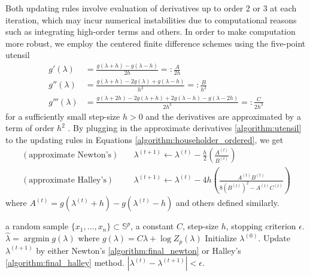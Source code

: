 \documentclass[11pt]{article}
\DeclareMathOperator*{\argmin}{argmin}
\newcommand{\bbS}{\mathbb{S}}
\begin{document}
Both updating rules involve evaluation of derivatives up to order 2 or 3 at each iteration, which may incur numerical instabilities due to computational reasons such as integrating high-order terms and others. %
In order to make computation more robust, we  employ the centered finite difference schemes using the five-point utensil 
\begin{subequations}\label{algorithm:utensil}
	\begin{align}
	g'(\lambda) &= \frac{g(\lambda+h) - g(\lambda-h)}{2h} =: \frac{A}{2h} \\
	g''(\lambda) &= \frac{g(\lambda+h)-2g(\lambda)+g(\lambda-h)}{h^2} =: \frac{B}{h^2} \\
	g'''(\lambda) &= \frac{g(\lambda+2h)-2g(\lambda+h)+2g(\lambda-h)-g(\lambda-2h)}{2h^3} =: \frac{C}{2h^3}
	\end{align}
\end{subequations}
for a sufficiently small step-size $h>0$ and the derivatives are approximated by a term of order $h^2$ \citep{burden_numerical_2016}. By plugging in the approximate derivatives \eqref{algorithm:utensil} to the updating rules in Equations \eqref{algorithm:householder_ordered}, we get
\begin{align}
(\textrm{approximate Newton's}) \quad&
\lambda^{(t+1)} \leftarrow  \lambda^{(t)} - \frac{h}{2} \left(\frac{A^{(t)}}{B^{(t)}}\right) \label{algorithm:final_newton}\\
(\textrm{approximate Halley's}) \quad & \lambda^{(t+1)} \leftarrow \lambda^{(t)} - 4h \left(\frac{
	A^{(t)}B^{(t)}
}{
8 (B^{(t)})^2 - A^{(t)}C^{(t)}
}\right)  \label{algorithm:final_halley}
\end{align}
where $A^{(t)} = g(\lambda^{(t)}+h) - g(\lambda^{(t)}-h)$ and others defined similarly. 

\begin{algorithm}
	\caption{Maximum likelihood estimation of the concentration parameter}
	\label{code:lkd_lambda}
	\begin{algorithmic}
		\REQUIRE a random sample $\lbrace x_1,\ldots,x_n\rbrace \subset \bbS^p$, a constant $C$, step-size $h$, stopping criterion $\epsilon$.
		\ENSURE $\hat{\lambda} = \argmin g(\lambda)$ where $g(\lambda) = C \lambda + \log Z_p (\lambda)$		
		\STATE Initialize $\lambda^{(0)}$.
		\REPEAT 
		\STATE Update $\lambda^{(t+1)}$ by either Newton's  \eqref{algorithm:final_newton} or Halley's \eqref{algorithm:final_halley} method.
		\UNTIL $|\lambda^{(t)} - \lambda^{(t+1)}|<\epsilon$.
	\end{algorithmic}
\end{algorithm}
\end{document}
